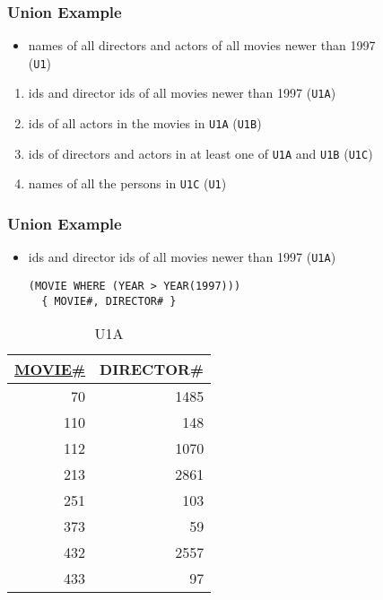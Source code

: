 \documentclass[dvipsnames]{beamer}
\theoremstyle{plain}
\begin{document}
\begin{frame}
  \frametitle{Union Example}

  \begin{itemize}
    \item names of all directors and actors of all movies newer than 1997\\
      (\texttt{U1})
  \end{itemize}

  \pause
  \begin{enumerate}
    \item ids and director ids of all movies newer than 1997 (\texttt{U1A})
    \item ids of all actors in the movies in \texttt{U1A} (\texttt{U1B})
    \item ids of directors and actors in at least one of
      \texttt{U1A} and \texttt{U1B} (\texttt{U1C})
    \item names of all the persons in \texttt{U1C} (\texttt{U1})
  \end{enumerate}
\end{frame}

\begin{frame}[fragile]
  \frametitle{Union Example}

  \begin{itemize}
    \item ids and director ids of all movies newer than 1997 (\texttt{U1A})
    \begin{lstlisting}
(MOVIE WHERE (YEAR > YEAR(1997)))
  { MOVIE#, DIRECTOR# }
    \end{lstlisting}
  \end{itemize}

  \vspace{-10pt}
  \begin{tiny}
  \begin{table}
    \caption{U1A}
    \begin{tabular}{|r|r|}\hline
\underline{MOVIE\#} & DIRECTOR\#\\[2pt]\hline\hline
 70 &       1485\\\hline
110 &        148\\\hline
112 &       1070\\\hline
213 &       2861\\\hline
251 &        103\\\hline
373 &         59\\\hline
432 &       2557\\\hline
433 &         97\\\hline
    \end{tabular}
  \end{table}
  \end{tiny}
\end{frame}
\end{document}
